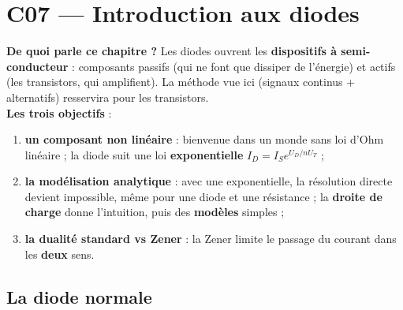 \chapter{C07 --- Introduction aux diodes}

\begin{rembox}[title=En bref]
\textbf{De quoi parle ce chapitre ?} Les diodes ouvrent les \textbf{dispositifs à
semi-conducteur} : composants passifs (qui ne font que dissiper de l'énergie) et actifs (les
transistors, qui amplifient). La méthode vue ici (signaux continus + alternatifs) resservira
pour les transistors. \\
\textbf{Les trois objectifs} :
\begin{enumerate}
  \item \textbf{un composant non linéaire} : \og bienvenue dans un monde sans loi d'Ohm
        linéaire\fg{} ; la diode suit une loi \textbf{exponentielle} $I_D = I_S e^{U_D/nU_T}$ ;
  \item \textbf{la modélisation analytique} : avec une exponentielle, la résolution directe
        devient impossible, même pour une diode et une résistance ; la \textbf{droite de
        charge} donne l'intuition, puis des \textbf{modèles} simples ;
  \item \textbf{la dualité standard vs Zener} : la Zener limite le passage du courant dans
        les \textbf{deux} sens.
\end{enumerate}
\end{rembox}

\section{La diode normale}


